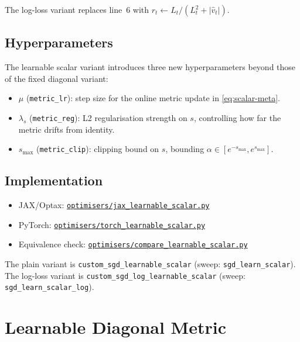 \documentclass{article}
\begin{document}
\noindent
The log-loss variant replaces line~6 with
$r_t \leftarrow L_t/(L_t^2 + |\hat{v}_t|)$.

\subsection{Hyperparameters}
The learnable scalar variant introduces three new hyperparameters beyond those of the fixed diagonal variant:
\begin{itemize}
    \item $\mu$ (\texttt{metric\_lr}): step size for the online metric update in \eqref{eq:scalar-meta}.
    \item $\lambda_s$ (\texttt{metric\_reg}): L2 regularisation strength on $s$, controlling how far the metric drifts from identity.
    \item $s_{\max}$ (\texttt{metric\_clip}): clipping bound on $s$, bounding $\alpha\in[e^{-s_{\max}}, e^{s_{\max}}]$.
\end{itemize}

\subsection{Implementation}
\begin{itemize}
    \item JAX/Optax: \href{https://github.com/Noah-Everett/Induced-Metric-Optimiser/blob/main/optimisers/jax_learnable_scalar.py}{\texttt{optimisers/jax\_learnable\_scalar.py}}
    \item PyTorch: \href{https://github.com/Noah-Everett/Induced-Metric-Optimiser/blob/main/optimisers/torch_learnable_scalar.py}{\texttt{optimisers/torch\_learnable\_scalar.py}}
    \item Equivalence check: \href{https://github.com/Noah-Everett/Induced-Metric-Optimiser/blob/main/optimisers/compare_learnable_scalar.py}{\texttt{optimisers/compare\_learnable\_scalar.py}}
\end{itemize}
\begin{sloppypar}
The plain variant is \texttt{custom\_sgd\_learnable\_scalar} (sweep: \texttt{sgd\_learn\_scalar}).
The log-loss variant is \texttt{custom\_sgd\_log\_learnable\_scalar} (sweep: \texttt{sgd\_learn\_scalar\_log}).
\end{sloppypar}


\section{Learnable Diagonal Metric}\label{sec:diag}
\end{document}
